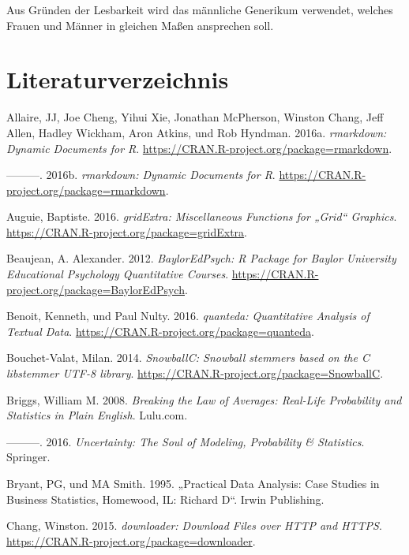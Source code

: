 \documentclass[12pt,ngerman,]{book}
\theoremstyle{definition}
\theoremstyle{definition}
\theoremstyle{remark}
\begin{document}
Aus Gründen der Lesbarkeit wird das männliche Generikum verwendet,
welches Frauen und Männer in gleichen Maßen ansprechen soll.

\chapter{Literaturverzeichnis}\label{literaturverzeichnis}

\hypertarget{refs}{}
\hypertarget{ref-rmarkdown}{}
Allaire, JJ, Joe Cheng, Yihui Xie, Jonathan McPherson, Winston Chang,
Jeff Allen, Hadley Wickham, Aron Atkins, und Rob Hyndman. 2016a.
\emph{rmarkdown: Dynamic Documents for R}.
\url{https://CRAN.R-project.org/package=rmarkdown}.

\hypertarget{ref-R-rmarkdown}{}
---------. 2016b. \emph{rmarkdown: Dynamic Documents for R}.
\url{https://CRAN.R-project.org/package=rmarkdown}.

\hypertarget{ref-R-gridExtra}{}
Auguie, Baptiste. 2016. \emph{gridExtra: Miscellaneous Functions for
„Grid`` Graphics}. \url{https://CRAN.R-project.org/package=gridExtra}.

\hypertarget{ref-R-BaylorEdPsych}{}
Beaujean, A. Alexander. 2012. \emph{BaylorEdPsych: R Package for Baylor
University Educational Psychology Quantitative Courses}.
\url{https://CRAN.R-project.org/package=BaylorEdPsych}.

\hypertarget{ref-R-quanteda}{}
Benoit, Kenneth, und Paul Nulty. 2016. \emph{quanteda: Quantitative
Analysis of Textual Data}.
\url{https://CRAN.R-project.org/package=quanteda}.

\hypertarget{ref-R-SnowballC}{}
Bouchet-Valat, Milan. 2014. \emph{SnowballC: Snowball stemmers based on
the C libstemmer UTF-8 library}.
\url{https://CRAN.R-project.org/package=SnowballC}.

\hypertarget{ref-breaking}{}
Briggs, William M. 2008. \emph{Breaking the Law of Averages: Real-Life
Probability and Statistics in Plain English}. Lulu.com.

\hypertarget{ref-uncertainty}{}
---------. 2016. \emph{Uncertainty: The Soul of Modeling, Probability \&
Statistics}. Springer.

\hypertarget{ref-bryant1995practical}{}
Bryant, PG, und MA Smith. 1995. „Practical Data Analysis: Case Studies
in Business Statistics, Homewood, IL: Richard D``. Irwin Publishing.

\hypertarget{ref-R-downloader}{}
Chang, Winston. 2015. \emph{downloader: Download Files over HTTP and
HTTPS}. \url{https://CRAN.R-project.org/package=downloader}.
\end{document}
